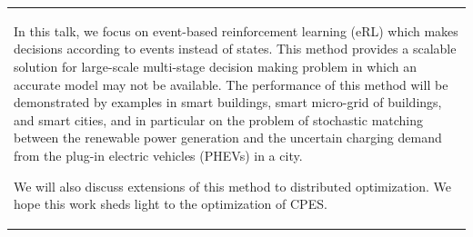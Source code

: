 \documentclass[
	openany, %
	parskip=full, %
	12pt, %
	a4paper, %
]{conferencebooklet} %
\begin{document}
\begin{table}[h!]
{\begin{tabular}{p{75mm}}
            In this talk, we focus on event-based reinforcement learning (eRL) which makes decisions according to events instead of states. 
            This method provides a scalable solution for large-scale multi-stage decision making problem in which an accurate model may not be available. The performance of this method will be demonstrated by examples in smart buildings, smart micro-grid of buildings, and smart cities, and in particular on the problem of stochastic matching between the renewable power generation and the uncertain charging demand from the plug-in electric vehicles (PHEVs) in a city. 
            
            We will also discuss extensions of this method to distributed optimization. We hope this work sheds light to the optimization of CPES.
        \end{tabular}
    }
\end{table}

\end{document}

